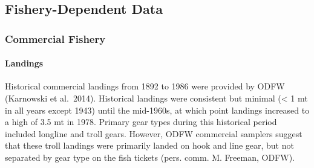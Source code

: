 \documentclass[11pt,
  english,
  a4paper,
]{article}
\begin{document}
\leavevmode\tagmcend\tagstructend\par


\hypertarget{fishery-dependent-data}{%
\subsection{Fishery-Dependent Data}\label{fishery-dependent-data}}

\leavevmode\tagmcend\tagstructend


\hypertarget{commercial-fishery}{%
\subsubsection{Commercial Fishery}\label{commercial-fishery}}

\leavevmode\tagmcend\tagstructend


\hypertarget{landings}{%
\paragraph{Landings}\label{landings}}

\leavevmode\tagmcend\tagstructend


Historical commercial landings from 1892 to 1986 were provided by ODFW (Karnowski et al.~2014). Historical landings were consistent but minimal (\textless{} 1 mt in all years except 1943) until the mid-1960s, at which point landings increased to a high of 3.5 mt in 1978. Primary gear types during this historical period included longline and troll gears. However, ODFW commercial samplers suggest that these troll landings were primarily landed on hook and line gear, but not separated by gear type on the fish tickets (pers. comm. M. Freeman, ODFW).

\leavevmode\tagmcend\tagstructend\par

\end{document}
